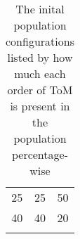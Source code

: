 \begin{table}[h]
\begin{tabular}{ccc}
\multicolumn{1}{c|}{25}                                                 & \multicolumn{1}{c|}{25}                                                  & 50                                                                       \\
\multicolumn{1}{c|}{40}                                                 & \multicolumn{1}{c|}{40}                                                  & 20                                                                       \\
   & &                
\end{tabular}
\caption{The inital population configurations listed by how much each order of ToM is present in the population percentage-wise}
\label{tab:reg-population-table}
\end{table}